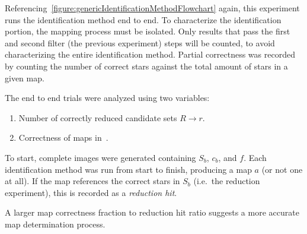 Referencing~\autoref{figure:genericIdentificationMethodFlowchart} again, this experiment runs the identification
method end to end.
To characterize the identification portion, the mapping process must be isolated.
Only results that pass the first and second filter (the previous experiment) steps will be counted, to avoid
characterizing the entire identification method.
Partial correctness was recorded by counting the number of correct stars against the total amount of stars in a given
map.

The end to end trials were analyzed using two variables:
\begin{enumerate}
    \item \label{itm:correctReducedCandidates} Number of correctly reduced candidate sets $R \rightarrow r$.
    \item Correctness of maps in~.
\end{enumerate}

To start, complete images were generated containing $S_b$, $c_b$, and $f$.
Each identification method was run from start to finish, producing a map $a$ (or not one at all).
If the map references the correct stars in $S_b$ (i.e.\ the reduction experiment), this is recorded as a
\textit{reduction hit}.

A larger map correctness fraction to reduction hit ratio suggests a more accurate map determination process.